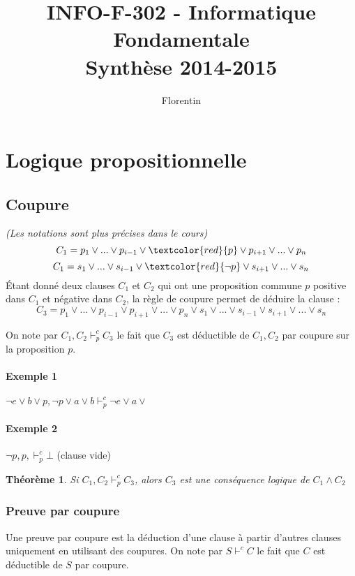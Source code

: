 \documentclass[a4paper]{article}
\title{
    INFO-F-302 - Informatique Fondamentale\\
    \small Synthèse 2014-2015
}
\author{Florentin \bsc{Hennecker}}
\date{}
\newtheorem{theorem}{Théorème}[section]
\begin{document}
\maketitle
\tableofcontents

\section{Logique propositionnelle}

  \subsection{Coupure}
  \textit{(Les notations sont plus précises dans le cours)}\\
  $$ C_1 = p_1 \lor ... \lor p_{i-1} \lor \textcolor{red}{p} \lor p_{i+1} \lor ... \lor p_n$$
  $$ C_1 = s_1 \lor ... \lor s_{i-1} \lor \textcolor{red}{\lnot p} \lor s_{i+1} \lor ... \lor s_n$$
  \'Etant donné deux clauses $C_1$ et $C_2$ qui ont une proposition commune $p$
  positive dans $C_1$ et négative dans $C_2$, la règle de coupure permet de déduire
  la clause : 
  $$ C_3 = p_1 \lor ... \lor p_{i-1} \lor p_{i+1} \lor ... \lor p_n
     \lor s_1 \lor ... \lor s_{i-1} \lor s_{i+1} \lor ... \lor s_n$$

  On note par $C_1, C_2 \vdash^c_p C_3$ le fait que $C_3$ est déductible de 
  $C_1, C_2$ par coupure sur la proposition $p$.

  \paragraph{Exemple 1} $ \lnot e \lor b \lor p, \lnot p \lor a \lor b \vdash^c_p \lnot e \lor a \lor $
  \paragraph{Exemple 2} $ \lnot p, p, \vdash^c_p \bot $ (clause vide)

  \begin{theorem}
  Si $C_1, C_2 \vdash^c_p C_3$, alors $C_3$ est une conséquence logique de $C_1 \land C_2$
  \end{theorem}

  \subsubsection{Preuve par coupure}
  Une preuve par coupure est la déduction d'une clause à partir d'autres clauses uniquement
  en utilisant des coupures. On note par $S \vdash^c C$ le fait que $C$ est déductible de $S$ par coupure.
\end{document}
